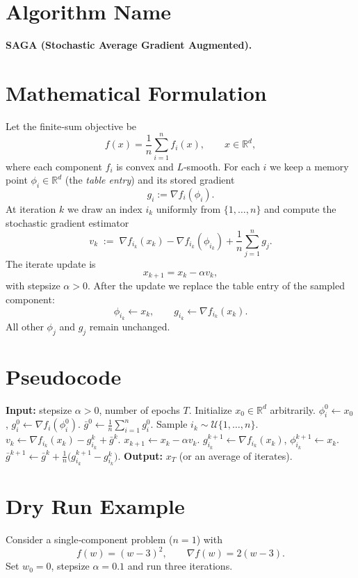 \documentclass[12pt]{article}
\newcommand{\R}{\mathbb{R}}
\newcommand{\grad}{\nabla}
\begin{document}
\section*{Algorithm Name}
\textbf{SAGA (Stochastic Average Gradient Augmented).}

\section*{Mathematical Formulation}
Let the finite‑sum objective be 
\[
f(x)=\frac1n\sum_{i=1}^{n} f_i(x),\qquad x\in\R^{d},
\]
where each component $f_i$ is convex and $L$‑smooth.  
For each $i$ we keep a memory point $\phi_i\in\R^{d}$ (the \emph{table entry}) and its stored gradient
\[
g_i:=\grad f_i(\phi_i).
\]
At iteration $k$ we draw an index $i_k$ uniformly from $\{1,\dots ,n\}$ and compute the stochastic gradient estimator
\[
v_k \;:=\; \grad f_{i_k}(x_k)-\grad f_{i_k}(\phi_{i_k})+\frac1n\sum_{j=1}^{n} g_j .
\tag{1}
\]
The iterate update is
\[
x_{k+1}=x_k-\alpha v_k ,
\tag{2}
\]
with stepsize $\alpha>0$.  
After the update we replace the table entry of the sampled component:
\[
\phi_{i_k}\leftarrow x_k,\qquad g_{i_k}\leftarrow \grad f_{i_k}(x_k).
\tag{3}
\]
All other $\phi_j$ and $g_j$ remain unchanged.

\section*{Pseudocode}
\begin{algorithm}[H]
\caption{SAGA}
\begin{algorithmic}[1]
\State \textbf{Input:} stepsize $\alpha>0$, number of epochs $T$.
\State Initialize $x_0\in\R^{d}$ arbitrarily.
    \State $\phi_i^{0}\gets x_0$, \; $g_i^{0}\gets \grad f_i(\phi_i^{0})$.
\EndFor
\State $\bar g^{0}\gets \frac1n\sum_{i=1}^{n} g_i^{0}$.
    \State Sample $i_k\sim\mathcal{U}\{1,\dots ,n\}$.
    \State $v_k \gets \grad f_{i_k}(x_k)-g_{i_k}^{k}+\bar g^{k}$.
    \State $x_{k+1}\gets x_k-\alpha v_k$.
    \State $g_{i_k}^{k+1}\gets \grad f_{i_k}(x_k)$,\;
          $\phi_{i_k}^{k+1}\gets x_k$.
    \State $\bar g^{k+1}\gets \bar g^{k}+ \frac1n\bigl(g_{i_k}^{k+1}-g_{i_k}^{k}\bigr)$.
\EndFor
\State \textbf{Output:} $x_T$ (or an average of iterates).
\end{algorithmic}
\end{algorithm}

\section*{Dry Run Example}
Consider a single‑component problem ($n=1$) with
\[
f(w)=(w-3)^2,\qquad \grad f(w)=2(w-3).
\]
Set $w_0=0$, stepsize $\alpha=0.1$ and run three iterations.
\end{document}
